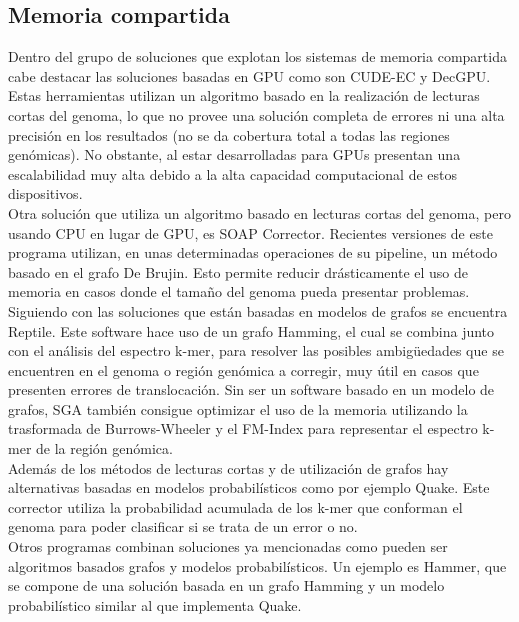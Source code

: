 \documentclass[conference]{IEEEtran}
\begin{document}
\subsection{Memoria compartida}

Dentro del grupo de soluciones que explotan los sistemas de memoria compartida cabe destacar las soluciones basadas en GPU como son CUDE-EC\cite{cuda-ec} y DecGPU\cite{decgpu}. Estas herramientas utilizan un algoritmo basado en la realización de lecturas cortas del genoma, lo que no provee una solución completa de errores ni una alta precisión en los resultados (no se da cobertura total a todas las regiones genómicas). No obstante, al estar desarrolladas para GPUs presentan una escalabilidad muy alta debido a la alta capacidad computacional de estos dispositivos.\\

Otra solución que utiliza un algoritmo basado en lecturas cortas del genoma, pero usando CPU en lugar de GPU, es SOAP Corrector\cite{soap_corrector}. Recientes versiones de este programa utilizan, en unas determinadas operaciones de su pipeline, un método basado en el grafo De Brujin. Esto permite reducir drásticamente el uso de memoria en casos donde el tamaño del genoma pueda presentar problemas.\\

Siguiendo con las soluciones que están basadas en modelos de grafos se encuentra Reptile\cite{reptile}. Este software hace uso de un grafo Hamming, el cual se combina junto con el análisis del espectro k-mer, para resolver las posibles ambigüedades que se encuentren en el genoma o región genómica a corregir, muy útil en casos que presenten errores de translocación. Sin ser un software basado en un modelo de grafos, SGA\cite{sga} también consigue optimizar el uso de la memoria utilizando la trasformada de Burrows-Wheeler y el FM-Index para representar el espectro k-mer de la región genómica.\\

Además de los métodos de lecturas cortas y de utilización de grafos hay alternativas basadas en modelos probabilísticos como por ejemplo Quake\cite{quake}. Este corrector utiliza la probabilidad acumulada de los k-mer que conforman el genoma para poder clasificar si se trata de un error o no.\\

Otros programas combinan soluciones ya mencionadas como pueden ser algoritmos basados grafos y modelos probabilísticos. Un ejemplo es Hammer\cite{hammer}, que se compone de una solución basada en un grafo Hamming y un modelo probabilístico similar al que implementa Quake.\\
\end{document}
